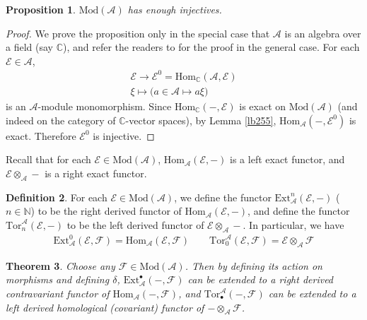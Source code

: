 \documentclass[12pt,b5paper,notitlepage]{report}
\theoremstyle{definition}
\newtheorem{df}{Definition}[section]
\theoremstyle{plain}
\newtheorem{thm}[df]{Theorem}
\newtheorem{pp}[df]{Proposition}
\newcommand{\mc}{\mathcal}
\newcommand{\Hom}{\mathrm{Hom}}
\newcommand{\blt}{\bullet}
\newcommand{\Cbb}{\mathbb C}
\newcommand{\Nbb}{\mathbb N}
\newcommand{\Ext}{\mathrm{Ext}}
\newcommand{\Tor}{\mathrm{Tor}}
\newcommand{\Mod}{\mathrm{Mod}}
\numberwithin{equation}{section}
\begin{document}
\begin{pp}\label{lb311}
$\Mod(\mc A)$ has enough injectives.
\end{pp}




\begin{proof}
We prove the proposition only in the special case that $\mc A$ is an algebra over a field (say $\Cbb$), and refer the readers to \cite[Sec. XX.4]{Lang} for the proof in the general case. For each $\mc E\in\mc A$,
\begin{gather*}
\mc E\rightarrow \mc E^0=\Hom_\Cbb(\mc A,\mc E)\\
\xi\mapsto \big(a\in\mc A\mapsto a\xi\big)
\end{gather*}
is an $\mc A$-module monomorphism. Since $\Hom_\Cbb(-,\mc E)$ is exact on $\Mod(\mc A)$ (and indeed on the category of $\Cbb$-vector spaces), by Lemma \ref{lb255}, $\Hom_{\mc A}(-,\mc E^0)$ is exact. Therefore $\mc E^0$ is injective.
\end{proof}

Recall that for each $\mc E\in\Mod(\mc A)$, $\Hom_{\mc A}(\mc E,-)$ is a left exact functor, and $\mc E\otimes_{\mc A}-$ is a right exact functor.

\begin{df}
For each $\mc E\in\Mod(\mc A)$, we define the functor $\Ext^n_{\mc A}(\mc E,-)$ ($n\in\Nbb$) to be the right derived functor of $\Hom_{\mc A}(\mc E,-)$, and define the functor $\Tor_n^{\mc A}(\mc E,-)$ to be the left derived functor of $\mc E\otimes_{\mc A}-$. In particular, we have
\begin{align*}
\Ext^0_{\mc A}(\mc E,\mc F)=\Hom_{\mc A}(\mc E,\mc F)\qquad \Tor_0^{\mc A}(\mc E,\mc F)=\mc E\otimes_{\mc A}\mc F
\end{align*}
\end{df}



\begin{thm}\label{lb257}
Choose any $\mc F\in\Mod(\mc A)$. Then by defining its action on morphisms and defining $\delta$, $\Ext^\blt_{\mc A}(-,\mc F)$ can be extended to a right derived contravariant functor  of $\Hom_{\mc A}(-,\mc F)$, and $\Tor^{\mc A}_\blt(-,\mc F)$ can be extended to a left derived homological (covariant) functor of $-\otimes_{\mc A}\mc F$.
\end{thm}
\end{document}
